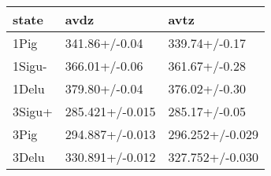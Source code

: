 \begin{tabular}{lll}
\toprule
state & avdz & avtz \\
\midrule
1Pig & 341.86+/-0.04 & 339.74+/-0.17 \\
1Sigu- & 366.01+/-0.06 & 361.67+/-0.28 \\
1Delu & 379.80+/-0.04 & 376.02+/-0.30 \\
3Sigu+ & 285.421+/-0.015 & 285.17+/-0.05 \\
3Pig & 294.887+/-0.013 & 296.252+/-0.029 \\
3Delu & 330.891+/-0.012 & 327.752+/-0.030 \\
\bottomrule
\end{tabular}
